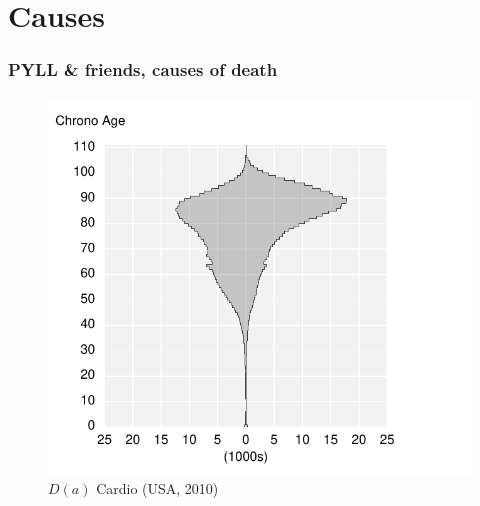 \documentclass{beamer}
\begin{document}
\section{Causes}
\begin{frame}
\frametitle{PYLL \& friends, causes of death}
\vspace{-1cm}
\begin{figure}[b]
    \centering
    \includegraphics[scale=.7]{Figures/f7_Dac.pdf}
    \caption{$D(a)$ Cardio (USA, 2010)}
\end{figure} 
\end{frame}
\end{document}
